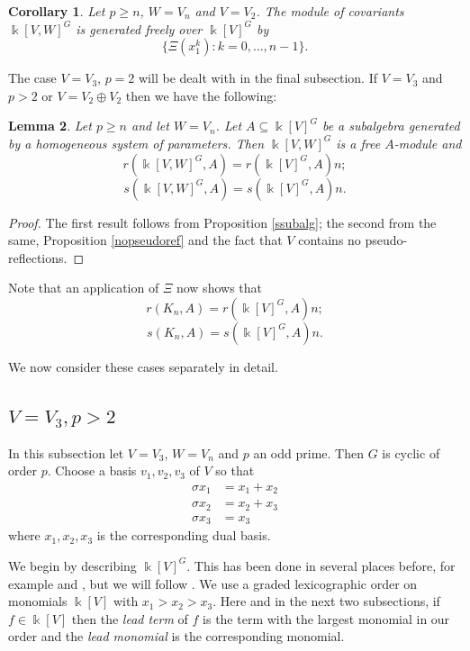 \documentclass[a4paper]{amsart}
\newcommand{\kk}{\Bbbk}
\newtheorem{Lemma}{Lemma}
\newtheorem{Corollary}[Lemma]{Corollary}
\newtheorem*{Corollary of Conjecture}{Corollary of Conjecture}
\theoremstyle{definition}
\theoremstyle{remark}
\theoremstyle{Acknowledgments}
\begin{document}
\begin{Corollary}\label{mainv2}
Let $p \geq n$, $W = V_n$ and $V = V_2$. The module of covariants $\kk[V,W]^G$ is generated freely over $\kk[V]^G$ by 
\[\{\Xi(x_1^k): k = 0, \ldots, n-1\}.\]
\end{Corollary}

The case $V = V_3$, $p=2$ will be dealt with in the final subsection.
If $V = V_3$ and $p>2$ or $V = V_2 \oplus V_2$ then we have the following:

\begin{Lemma}\label{rsnoref}
Let $p \geq n$ and let $W = V_n$. Let $A \subseteq \kk[V]^G$ be a subalgebra generated by a homogeneous system of parameters. Then $\kk[V,W]^G$ is a free $A$-module and
\[r(\kk[V,W]^G,A) = r(\kk[V]^G,A)n; \]
\[s(\kk[V,W]^G,A) = s(\kk[V]^G,A)n.\] 
\end{Lemma}

\begin{proof}
The first result follows from Proposition \ref{ssubalg}; the second from the same, Proposition \ref{nopseudoref} and the fact that $V$ contains no pseudo-reflections.
\end{proof}

Note that an application of $\Xi$ now shows that
\[r(K_n,A) = r(\kk[V]^G,A)n; \]
\[s(K_n,A) = s(\kk[V]^G,A)n.\] 

We now consider these cases separately in detail.
\subsection{$V = V_3, p>2$}
In this subsection let $V=V_3$, $W = V_n$ and $p$ an odd prime. Then $G$ is cyclic of order $p$. Choose a basis $v_1,v_2, v_3$ of $V$ so that
\begin{align*}\sigma x_1 &= x_1+x_2\\
\sigma x_2 &= x_2+x_3\\
\sigma x_3 &= x_3 \end{align*}
where $x_1,x_2,x_3$ is the corresponding dual basis.

We begin by describing $\kk[V]^G$. This has been done in several places before, for example \cite{DicksonMadison} and \cite[Theorem~5.8]{Peskin}, but we will follow \cite{ElmerCov}. We use a graded lexicographic order on monomials $\kk[V]$ with $x_1>x_2>x_3$. Here and in the next two subsections, if $f \in \kk[V]$ then the {\it lead term} of $f$ is the term with the largest monomial in our order and the {\it lead monomial} is the corresponding monomial.
\end{document}
